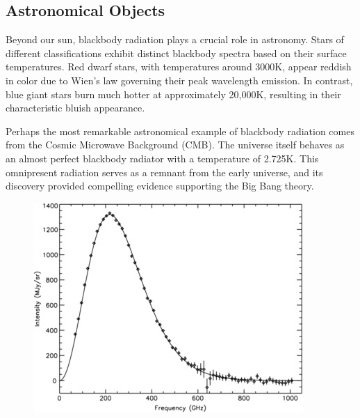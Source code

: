 \documentclass[
  a4paper,
]{book}
\begin{document}
\begin{tcolorbox}[enhanced jigsaw, coltitle=black, title=\textcolor{quarto-callout-tip-color}{\faLightbulb}\hspace{0.5em}{Real-World Examples of Blackbody Radiation}, colframe=quarto-callout-tip-color-frame, toprule=.15mm, opacitybacktitle=0.6, left=2mm, opacityback=0, breakable, toptitle=1mm, bottomtitle=1mm, leftrule=.75mm, arc=.35mm, titlerule=0mm, colbacktitle=quarto-callout-tip-color!10!white, rightrule=.15mm, bottomrule=.15mm, colback=white]

\subsection{Astronomical Objects}\label{astronomical-objects}

Beyond our sun, blackbody radiation plays a crucial role in astronomy.
Stars of different classifications exhibit distinct blackbody spectra
based on their surface temperatures. Red dwarf stars, with temperatures
around 3000K, appear reddish in color due to Wien's law governing their
peak wavelength emission. In contrast, blue giant stars burn much hotter
at approximately 20,000K, resulting in their characteristic bluish
appearance.

Perhaps the most remarkable astronomical example of blackbody radiation
comes from the Cosmic Microwave Background (CMB). The universe itself
behaves as an almost perfect blackbody radiator with a temperature of
2.725K. This omnipresent radiation serves as a remnant from the early
universe, and its discovery provided compelling evidence supporting the
Big Bang theory.

\begin{figure}[H]

\begin{minipage}{0.50\linewidth}

\includegraphics[width=1\linewidth,height=\textheight,keepaspectratio]{quantum-mechanics/img/CMB_spectrum.jpg}


\end{minipage}
\end{figure}
\end{tcolorbox}
\end{document}
